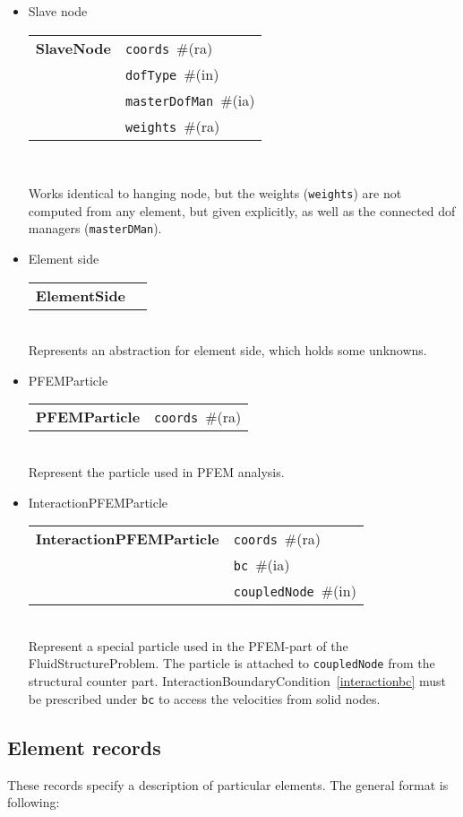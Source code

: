 \documentclass[a4paper]{article}
\newcommand{\param}[1]{\texttt{#1}} %
\newcommand{\field}[2]{\param{#1}~\#{\tiny(#2)}} %
\newcommand{\entKeywordInst}[1]{\textbf{#1}} %
\newenvironment{record}[1][]{\begin{tabular}{|ll}}{\end{tabular}\\}
\newcommand{\recentry}[2]{{#1}&{#2}\\}
\newcounter{rcc}
\newenvironment{record}[1][\textwidth]{\setcounter{rcc}{0}\rowcolors{1}{lightgray}{lightgray}\tabularx{#1}{llR} \hline}
               {\endtabularx}
\newcommand{\recentry}[2]{\ifthenelse{\value{rcc}>0}{$\backslash$ \\}{\setcounter{rcc}{1}}{#1}&{#2}&}
\begin{document}
\begin{itemize}
\item Slave node

\begin{record}[0.9\textwidth]
  \recentry{\entKeywordInst{SlaveNode}}{\field{coords}{ra}}
  \recentry{}{\field{dofType}{in}}
  \recentry{}{\field{masterDofMan}{ia}}
  \recentry{}{\field{weights}{ra}}
\end{record}

Works identical to hanging node, but the weights (\param{weights}) are not computed from any element,
but given explicitly, as well as the connected dof managers (\param{masterDMan}).

\item Element side

\begin{record}[0.9\textwidth]
  \recentry{\entKeywordInst{ElementSide}}{}
\end{record}
Represents an abstraction for element side, which holds some unknowns.

\item PFEMParticle \label{pfemparticles}

\begin{record}[0.9\textwidth]
  \recentry{\entKeywordInst{PFEMParticle}}{\field{coords}{ra}}
\end{record}
Represent the particle used in PFEM analysis.

\item InteractionPFEMParticle \label{interactionparticle}

\begin{record}[0.9\textwidth]
  \recentry{\entKeywordInst{InteractionPFEMParticle}}{\field{coords}{ra}}
  \recentry{}{\field{bc}{ia}}
  \recentry{}{\field{coupledNode}{in}}
\end{record}
Represent a special particle used in the PFEM-part of the FluidStructureProblem. The particle is 
attached to \param{coupledNode} from the structural counter part. InteractionBoundaryCondition~\ref{interactionbc} must be prescribed under \param{bc} to access the velocities from solid nodes.

\end{itemize}

\subsection{Element records}
\label{_ElementsRecords}
These records specify a description of particular elements. The
general format is following:
\end{document}

